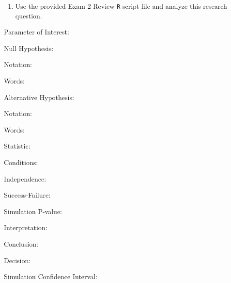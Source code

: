 \documentclass[
]{report}
\providecommand{\tightlist}{%
  \setlength{\itemsep}{0pt}\setlength{\parskip}{0pt}}
\newcommand{\rgi}{\hspace{24pt}}  %
\begin{document}
\vspace{0.8in}
\newpage

\begin{enumerate}
\def\labelenumi{\arabic{enumi}.}
\setcounter{enumi}{3}
\tightlist
\item
  Use the provided Exam 2 Review \texttt{R} script file and analyze this research question.
\end{enumerate}

\rgi Parameter of Interest:

\vspace{0.3in}

\rgi Null Hypothesis:

\rgi \rgi Notation:

\vspace{0.3in}

\rgi \rgi Words:

\vspace{0.5in}

\rgi Alternative Hypothesis:

\rgi \rgi Notation:

\vspace{0.3in}

\rgi \rgi Words:

\vspace{0.5in}

\rgi Statistic:

\vspace{0.3in}

\rgi Conditions:

\rgi \rgi Independence:

\vspace{0.8in}

\rgi \rgi Success-Failure:

\vspace{0.8in}

\rgi Simulation P-value:

\vspace{0.3in}

\rgi \rgi Interpretation:

\vspace{0.8in}

\rgi \rgi Conclusion:

\vspace{0.8in}

\rgi \rgi Decision:

\vspace{0.3in}

\rgi Simulation Confidence Interval:
\end{document}
